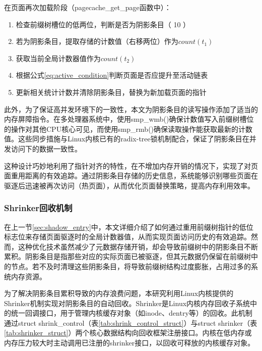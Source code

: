 在页面再次加载阶段（pagecache\_get\_page函数中）：
\begin{enumerate}
  \item 检查前缀树槽位的低两位，判断是否为阴影条目（ 10 ）
  \item 若为阴影条目，提取存储的计数值（右移两位）作为\(count(t_1)\)
  \item 获取当前全局计数器值作为\(count(t_2)\)
  \item 根据公式\ref{eq:active_condition}判断页面是否应提升至活动链表
  \item 更新相关统计计数并清除阴影条目，替换为新加载页面的指针
\end{enumerate}

此外，为了保证高并发环境下的一致性，本文为阴影条目的读写操作添加了适当的内存屏障指令。在多处理器系统中，使用smp\_wmb()确保计数值写入前缀树槽位的操作对其他CPU核心可见，而使用smp\_rmb()确保读取操作能获取最新的计数值。这些同步措施与Linux内核已有的radix-tree锁机制配合，保证了阴影条目在并发访问下的数据一致性。

这种设计巧妙地利用了指针对齐的特性，在不增加内存开销的情况下，实现了对页面重用距离的有效追踪。通过阴影条目存储的历史信息，系统能够识别哪些页面在驱逐后迅速被再次访问（热页面），从而优化页面替换策略，提高内存利用效率。


\subsubsection{Shrinker回收机制}

在上一节\ref{sec:shadow_entry}中，本文详细介绍了如何通过重用前缀树指针的低位标志位来存储页面驱逐时的全局计数器值，从而实现页面访问历史的有效追踪。然而，这种优化技术虽然减少了元数据存储开销，却会导致前缀树中的阴影条目不断累积。阴影条目是指那些对应的实际页面已被驱逐，但其元数据仍保留在前缀树中的节点。若不及时清理这些阴影条目，将导致前缀树结构过度膨胀，占用过多的系统内存资源。

为了解决阴影条目累积导致的内存浪费问题，本研究利用Linux内核提供的Shrinker机制实现对阴影条目的自动回收。Shrinker是Linux内核内存回收子系统中的统一回调接口，用于管理内核缓存对象（如inode、dentry等）的回收。此机制通过struct shrink\_control（表\ref{tab:shrink_control_struct}）与struct shrinker（表\ref{tab:shrinker_struct}）两个核心数据结构向回收框架注册接口。内核在低内存或内存压力较大时主动调用已注册的shrinker接口，以回收可释放的内核缓存对象。

